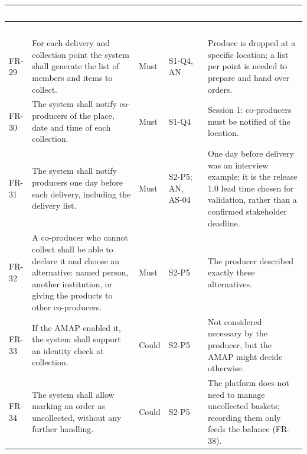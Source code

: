 \documentclass[11pt,a4paper]{article}
\begin{document}
{\footnotesize
\begin{longtable}{>{\raggedright\arraybackslash\hspace{0pt}}p{}>{\raggedright\arraybackslash\hspace{0pt}}p{}>{\raggedright\arraybackslash\hspace{0pt}}p{}>{\raggedright\arraybackslash\hspace{0pt}}p{}>{\raggedright\arraybackslash\hspace{0pt}}p{}}
\rowcolor{hdr}\textcolor{white}{\textbf{ID}} & \textcolor{white}{\textbf{Requirement}} & \textcolor{white}{\textbf{Prio.}} & \textcolor{white}{\textbf{Source}} & \textcolor{white}{\textbf{Justification}} \\ \endfirsthead
\rowcolor{hdr}\textcolor{white}{\textbf{ID}} & \textcolor{white}{\textbf{Requirement}} & \textcolor{white}{\textbf{Prio.}} & \textcolor{white}{\textbf{Source}} & \textcolor{white}{\textbf{Justification}} \\ \endhead
FR-29 & For each delivery and collection point the system shall generate the list of members and items to collect. & Must & S1-Q4, AN & Produce is dropped at a specific location; a list per point is needed to prepare and hand over orders. \\ \hline
FR-30 & The system shall notify co-producers of the place, date and time of each collection. & Must & S1-Q4 & Session 1: co-producers must be notified of the location. \\ \hline
FR-31 & The system shall notify producers one day before each delivery, including the delivery list. & Must & S2-P5; AN, AS-04 & One day before delivery was an interview example; it is the release 1.0 lead time chosen for validation, rather than a confirmed stakeholder deadline. \\ \hline
FR-32 & A co-producer who cannot collect shall be able to declare it and choose an alternative: named person, another institution, or giving the products to other co-producers. & Must & S2-P5 & The producer described exactly these alternatives. \\ \hline
FR-33 & If the AMAP enabled it, the system shall support an identity check at collection. & Could & S2-P5 & Not considered necessary by the producer, but the AMAP might decide otherwise. \\ \hline
FR-34 & The system shall allow marking an order as uncollected, without any further handling. & Could & S2-P5 & The platform does not need to manage uncollected baskets; recording them only feeds the balance (FR-38). \\ \hline
\end{longtable}}
\addtocounter{table}{-1}
\end{document}
